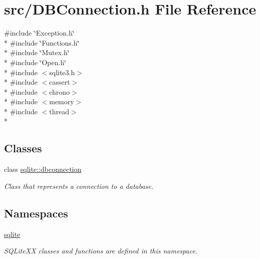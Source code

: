 \hypertarget{a00022}{\section{src/\-D\-B\-Connection.h File Reference}
\label{a00022}
}
{\ttfamily \#include \char`\"{}Exception.\-h\char`\"{}}\\*
{\ttfamily \#include \char`\"{}Functions.\-h\char`\"{}}\\*
{\ttfamily \#include \char`\"{}Mutex.\-h\char`\"{}}\\*
{\ttfamily \#include \char`\"{}Open.\-h\char`\"{}}\\*
{\ttfamily \#include $<$sqlite3.\-h$>$}\\*
{\ttfamily \#include $<$cassert$>$}\\*
{\ttfamily \#include $<$chrono$>$}\\*
{\ttfamily \#include $<$memory$>$}\\*
{\ttfamily \#include $<$thread$>$}\\*
\subsection*{Classes}
\begin{DoxyCompactItemize}
\item 
class \hyperlink{a00004}{sqlite\-::dbconnection}
\begin{DoxyCompactList}\small\item\em Class that represents a connection to a database. \end{DoxyCompactList}\end{DoxyCompactItemize}
\subsection*{Namespaces}
\begin{DoxyCompactItemize}
\item 
\hyperlink{a00038}{sqlite}
\begin{DoxyCompactList}\small\item\em S\-Q\-Lite\-X\-X classes and functions are defined in this namespace. \end{DoxyCompactList}\end{DoxyCompactItemize}
